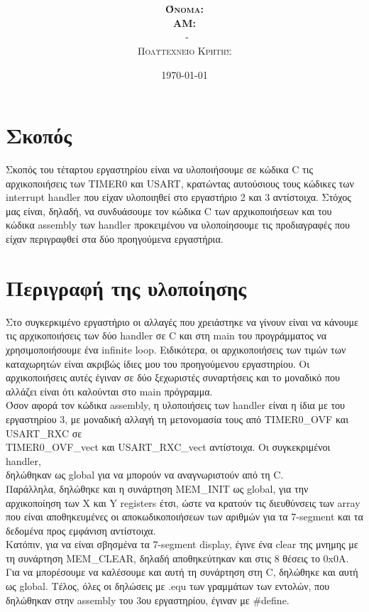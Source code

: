 \documentclass{article}
\title{\underline{\textbf{\assignmentNumber}}}
\author{\textsc{\textbf{Όνομα:}}  \studentName\\
		\textsc{\textbf{ΑΜ:}}  \studentNumber\\
		\course \ - \courseName\\ 
		\textsc{Πολυτεχνείο Κρήτης}
		}
\date{\today}
\begin{document}
	\maketitle

\section*{Σκοπός}
	Σκοπός του τέταρτου εργαστηρίου είναι να υλοποιήσουμε σε κώδικα C τις αρχικοποιήσεις των TIMER0 και USART, κρατώντας αυτούσιους τους κώδικες των interrupt handler που είχαν υλοποιηθεί στο εργαστήριο 2 και 3 αντίστοιχα. Στόχος μας είναι, δηλαδή, να συνδυάσουμε τον κώδικα C των αρχικοποιήσεων και του κώδικα assembly των handler προκειμένου να υλοποίησουμε τις προδιαγραφές που είχαν περιγραφθεί στα δύο προηγούμενα εργαστήρια.

\section*{Περιγραφή της υλοποίησης}
	Στο συγκερκιμένο εργαστήριο οι αλλαγές που χρειάστηκε να γίνουν είναι να κάνουμε τις αρχικοποιήσεις των δύο handler σε C και στη main του προγράμματος να χρησιμοποιήσουμε ένα infinite loop. Eιδικότερα, οι αρχικοποιήσεις των τιμών των καταχωρητών είναι ακριβώς ίδιες μου του προηγούμενου εργαστηρίου. Οι αρχικοποιήσεις αυτές έγιναν σε δύο ξεχωριστές συναρτήσεις και το μοναδικό που αλλάζει είναι ότι καλούνται στο main πρόγραμμα.\\
	
	\noindent
	Όσον αφορά τον κώδικα assembly, η υλοποιήσεις των handler είναι η ίδια με του εργαστηρίου 3, με μοναδική αλλαγή τη μετονομασία τους από TIMER0\_OVF και USART\_RXC σε \\ TIMER0\_OVF\_vect και USART\_RXC\_vect αντίστοιχα. Oι συγκεκριμένοι handler, \\ δηλώθηκαν ως global για να μπορούν να αναγνωριστούν από τη C.\\
	
	\noindent
	Παράλληλα, δηλώθηκε και η συνάρτηση MEM\_INIT ως global, για την αρχικοποίηση των X και Y registers έτσι, ώστε να κρατούν τις διευθύνσεις των array που είναι αποθηκευμένες οι αποκωδικοποιήσεων των αριθμών για τα 7-segment και τα δεδομένα προς εμφάνιση αντίστοιχα.\\
	
	\noindent
	Κατόπιν, για να είναι σβησμένα τα 7-segment display, έγινε ένα clear της μνημης με τη συνάρτηση MEM\_CLEAR, δηλαδή αποθηκεύτηκαν και στις 8 θέσεις το 0x0A. Για να μπορέσουμε να καλέσουμε και αυτή τη συνάρτηση στη C, δηλώθηκε και αυτή ως global. Τέλος, όλες οι δηλώσεις με .equ των γραμμάτων των εντολών, που δηλώθηκαν στην assembly του 3ου εργαστηρίου, έγιναν με \#define. \\
	
\end{document}
